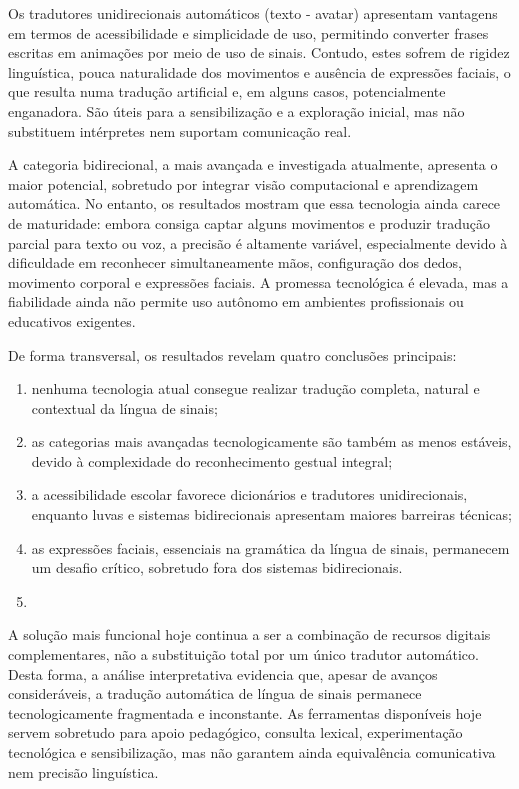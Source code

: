 \documentclass[portuguese]{textolivre}
\begin{document}
Os tradutores unidirecionais automáticos (texto - avatar) apresentam vantagens em termos de acessibilidade e simplicidade de uso, permitindo converter frases escritas em animações por meio de uso de sinais. Contudo, estes sofrem de rigidez linguística, pouca naturalidade dos movimentos e ausência de expressões faciais, o que resulta numa tradução artificial e, em alguns casos, potencialmente enganadora. São úteis para a sensibilização e a exploração inicial, mas não substituem intérpretes nem suportam comunicação real.

A categoria bidirecional, a mais avançada e investigada atualmente, apresenta o maior potencial, sobretudo por integrar visão computacional e aprendizagem automática. No entanto, os resultados mostram que essa tecnologia ainda carece de maturidade: embora consiga captar alguns movimentos e produzir tradução parcial para texto ou voz, a precisão é altamente variável, especialmente devido à dificuldade em reconhecer simultaneamente mãos, configuração dos dedos, movimento corporal e expressões faciais. A promessa tecnológica é elevada, mas a fiabilidade ainda não permite uso autônomo em ambientes profissionais ou educativos exigentes. 

De forma transversal, os resultados revelam quatro conclusões principais:

\begin{enumerate}
    \item nenhuma tecnologia atual consegue realizar tradução completa, natural e contextual da língua de sinais;
    \item as categorias mais avançadas tecnologicamente são também as menos estáveis, devido à complexidade do reconhecimento gestual integral;
    \item a acessibilidade escolar favorece dicionários e tradutores unidirecionais, enquanto luvas e sistemas bidirecionais apresentam maiores barreiras técnicas;
    \item as expressões faciais, essenciais na gramática da língua de sinais, permanecem um desafio crítico, sobretudo fora dos sistemas bidirecionais.
    \item 
\end{enumerate}

A solução mais funcional hoje continua a ser a combinação de recursos digitais complementares, não a substituição total por um único tradutor automático. Desta forma, a análise interpretativa evidencia que, apesar de avanços consideráveis, a tradução automática de língua de sinais permanece tecnologicamente fragmentada e inconstante. As ferramentas disponíveis hoje servem sobretudo para apoio pedagógico, consulta lexical, experimentação tecnológica e sensibilização, mas não garantem ainda equivalência comunicativa nem precisão linguística.
\end{document}

